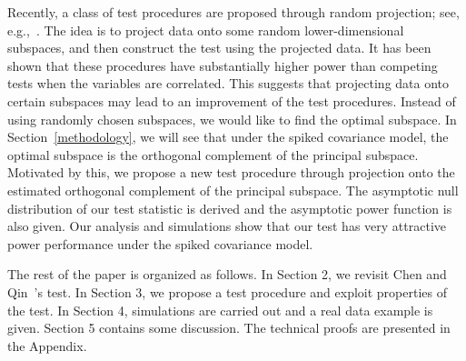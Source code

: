 \documentclass[times,sort&compress,3p]{elsarticle}
\theoremstyle{plain}
\theoremstyle{definition}
\theoremstyle{remark}
\begin{document}
Recently, a class of test procedures are proposed through random projection;
see, e.g.,~\cite{Lopes2015A,Thulin2014A,Srivastava2014RAPTT}.
The idea is to project data onto some random lower-dimensional subspaces, and then construct the test using the projected data.
It has been shown that these procedures have substantially higher power than competing tests when the variables are correlated. 
This suggests that projecting data onto certain subspaces may lead to an improvement of the test procedures.
Instead of using randomly chosen subspaces, we would like to find the optimal subspace.
In Section~\ref{methodology}, we will see that under the spiked covariance model, the optimal subspace is the orthogonal complement of the principal subspace.
Motivated by this, we propose a new test procedure through projection onto the estimated orthogonal complement of the principal subspace.  
The asymptotic null distribution of our test statistic is derived and the asymptotic power function is also given.
Our analysis and simulations show that our test has very attractive power performance under the spiked covariance model.




The rest of the paper is organized as follows. In Section 2,  we revisit Chen and Qin~\cite{Chen2010A}'s test.  In Section 3, we propose a test procedure and exploit properties of the test.  In Section 4, simulations are carried out and  a real data example is given. Section 5 contains some discussion. The technical proofs are presented in the Appendix.
\end{document}

